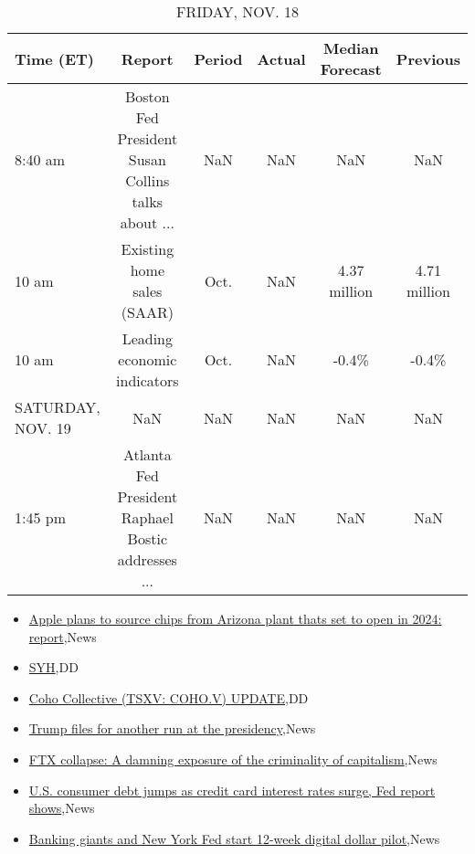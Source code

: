 \documentclass{article}%
\begin{document}
\begin{table}[htbp]%
\caption{FRIDAY, NOV. 18}%
\centering%
\begin{adjustbox}{width=1\textwidth}%
\begin{tabular}{lccccc}
\toprule
        Time (ET) &                                             Report & Period & Actual & Median Forecast &     Previous \\
\midrule
          8:40 am & Boston Fed President Susan Collins talks about ... &    NaN &    NaN &             NaN &          NaN \\
            10 am &                         Existing home sales (SAAR) &   Oct. &    NaN &    4.37 million & 4.71 million \\
            10 am &                        Leading economic indicators &   Oct. &    NaN &           -0.4\% &        -0.4\% \\
SATURDAY, NOV. 19 &                                                NaN &    NaN &    NaN &             NaN &          NaN \\
          1:45 pm & Atlanta Fed President Raphael Bostic addresses ... &    NaN &    NaN &             NaN &          NaN \\
\bottomrule
\end{tabular}
%
\end{adjustbox}%
\end{table}

%
\begin{itemize}%
\item%
\href{https://reddit.com/r/wallstreetbets/comments/ywhhzf/apple\_plans\_to\_source\_chips\_from\_arizona\_plant/}{Apple plans to source chips from Arizona plant thats set to open in 2024: report},News%
\item%
\href{https://reddit.com/r/Baystreetbets/comments/ywd7y9/syh/}{SYH},DD%
\item%
\href{https://reddit.com/r/Baystreetbets/comments/yw54t5/coho\_collective\_tsxv\_cohov\_update/}{Coho Collective (TSXV: COHO.V) UPDATE},DD%
\item%
\href{https://reddit.com/r/StockMarket/comments/ywgoqf/trump\_files\_for\_another\_run\_at\_the\_presidency/}{Trump files for another run at the presidency},News%
\item%
\href{https://reddit.com/r/Economics/comments/ywfqur/ftx\_collapse\_a\_damning\_exposure\_of\_the/}{FTX collapse: A damning exposure of the criminality of capitalism},News%
\item%
\href{https://reddit.com/r/Economics/comments/yw9oxr/us\_consumer\_debt\_jumps\_as\_credit\_card\_interest/}{U.S. consumer debt jumps as credit card interest rates surge, Fed report shows},News%
\item%
\href{https://reddit.com/r/Economics/comments/yw3w5s/banking\_giants\_and\_new\_york\_fed\_start\_12week/}{Banking giants and New York Fed start 12-week digital dollar pilot},News%
\end{itemize}%
\end{document}
